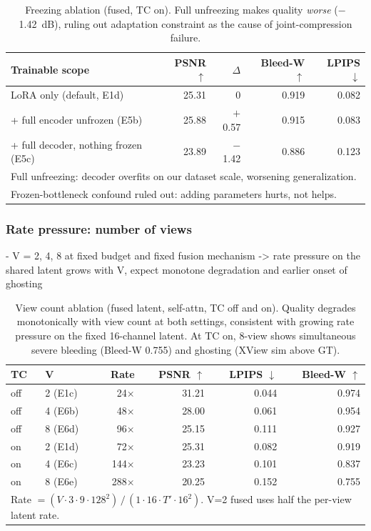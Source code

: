 \begin{table}[t]
\centering
\caption{Freezing ablation (fused, TC on). Full unfreezing makes quality \emph{worse} ($-$1.42~dB), ruling out adaptation constraint as the cause of joint-compression failure.}
\label{tab:unfreeze}
\begin{tabular}{lrrrr}
\toprule
Trainable scope & PSNR $\uparrow$ & $\Delta$ & Bleed-W $\uparrow$ & LPIPS $\downarrow$ \\
\midrule
LoRA only (default, E1d)           & 25.31 & 0       & 0.919 & 0.082 \\
+ full encoder unfrozen (E5b)       & 25.88 & $+$0.57 & 0.915 & 0.083 \\
+ full decoder, nothing frozen (E5c) & 23.89 & $-$1.42 & 0.886 & 0.123 \\
\bottomrule
\multicolumn{5}{l}{\small Full unfreezing: decoder overfits on our dataset scale, worsening generalization.}\\
\multicolumn{5}{l}{\small Frozen-bottleneck confound ruled out: adding parameters hurts, not helps.}\\
\end{tabular}
\end{table}

\subsubsection{Rate pressure: number of views}

- V = 2, 4, 8 at fixed budget and fixed fusion mechanism -> rate pressure on the shared latent grows with V, expect monotone degradation and earlier onset of ghosting

\begin{table}[t]
\centering
\caption{View count ablation (fused latent, self-attn, TC off and on). Quality degrades monotonically with view count at both settings, consistent with growing rate pressure on the fixed 16-channel latent. At TC on, 8-view shows simultaneous severe bleeding (Bleed-W 0.755) and ghosting (XView sim above GT).}
\label{tab:views}
\begin{tabular}{llrrrr}
\toprule
TC & V & Rate & PSNR $\uparrow$ & LPIPS $\downarrow$ & Bleed-W $\uparrow$ \\
\midrule
off & 2 (E1c)  & 24$\times$  & 31.21 & 0.044 & 0.974 \\
off & 4 (E6b)  & 48$\times$  & 28.00 & 0.061 & 0.954 \\
off & 8 (E6d)  & 96$\times$  & 25.15 & 0.111 & 0.927 \\
\midrule
on  & 2 (E1d)  & 72$\times$   & 25.31 & 0.082 & 0.919 \\
on  & 4 (E6c)  & 144$\times$  & 23.23 & 0.101 & 0.837 \\
on  & 8 (E6e)  & 288$\times$  & 20.25 & 0.152 & 0.755 \\
\bottomrule
\multicolumn{6}{l}{\small Rate $= (V{\cdot}3{\cdot}9{\cdot}128^2)\,/\,(1{\cdot}16{\cdot}T'{\cdot}16^2)$. V=2 fused uses half the per-view latent rate.}\\
\end{tabular}
\end{table}

